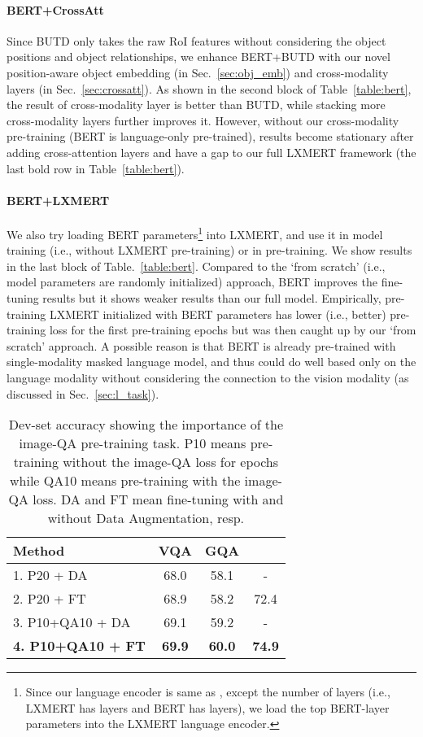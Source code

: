 \documentclass[11pt,a4paper]{article}
\begin{document}
\paragraph{BERT+CrossAtt}
\label{sec:bert_crossatt}
Since BUTD only takes the raw RoI features  without considering the object positions  and object relationships, we enhance BERT+BUTD with our novel position-aware object embedding (in Sec.~\ref{sec:obj_emb}) and cross-modality layers (in Sec.~\ref{sec:crossatt}).
As shown in the second block of Table~\ref{table:bert}, the result of  cross-modality layer is better than BUTD, while stacking more cross-modality layers further improves it.
However, without our cross-modality pre-training (BERT is language-only pre-trained),  results become stationary after adding  cross-attention layers and have a  gap to our full LXMERT framework (the last bold row in Table~\ref{table:bert}).
\paragraph{BERT+LXMERT}
\label{sec:bert_lxmert}
We also try loading BERT parameters\footnote{
Since our language encoder is same as , except the number of layers (i.e., LXMERT has  layers and BERT has  layers), we load the top  BERT-layer parameters into the LXMERT language encoder.
}
into LXMERT, and use it in model training (i.e., without LXMERT pre-training) or in pre-training.
We show results in the last block of Table.~\ref{table:bert}.
Compared to the `from scratch' (i.e., model parameters are randomly initialized) approach, BERT improves the fine-tuning results but it shows weaker results than our full model.
Empirically, pre-training LXMERT initialized with BERT parameters has lower (i.e., better) pre-training loss for the first  pre-training epochs but was then caught up by our `from scratch' approach.
A possible reason is that BERT is already pre-trained with single-modality masked language model, and thus could do well based only on the language modality without considering the connection to the vision modality (as discussed in Sec.~\ref{sec:l_task}).

\begin{table}[]
\centering
\begin{tabular}{lccc}
\toprule
Method                      & VQA   & GQA   &  \\
\midrule
1. P20 + DA                  &68.0   &58.1   &  -              \\
2. P20 + FT                  &68.9   &58.2   &  72.4           \\
3. P10+QA10 + DA             &69.1   &59.2   &   -             \\
\textbf{4. P10+QA10 + FT}    &\textbf{69.9}  &\textbf{60.0} &  \textbf{74.9}          \\
\bottomrule
\end{tabular}
\caption{Dev-set accuracy showing the importance of the image-QA pre-training task. P10 means pre-training without the image-QA loss for  epochs while QA10 means pre-training with the image-QA loss. 
DA and FT mean fine-tuning with and without Data Augmentation, resp.
}
\label{table:QA}
\vspace{-10pt}
\end{table}
\end{document}
